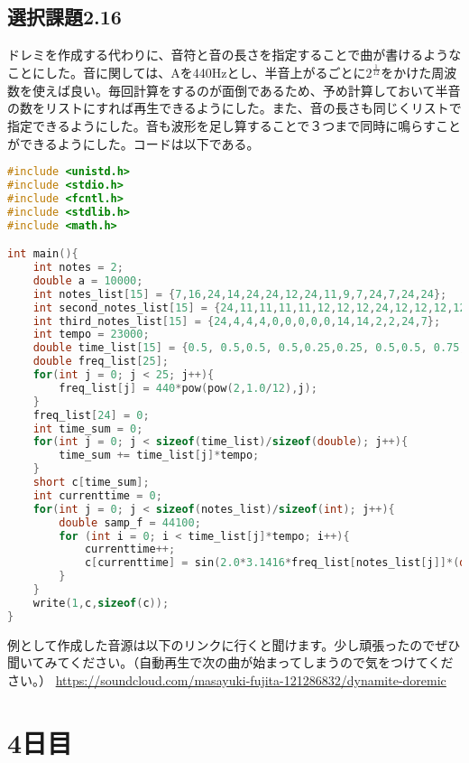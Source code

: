 \documentclass{ltjsarticle}
\begin{document}
\subsection{選択課題2.16}
ドレミを作成する代わりに、音符と音の長さを指定することで曲が書けるようなことにした。音に関しては、Aを440Hzとし、半音上がるごとに$2^\frac{1}{12}$をかけた周波数を使えば良い。毎回計算をするのが面倒であるため、予め計算しておいて半音の数をリストにすれば再生できるようにした。また、音の長さも同じくリストで指定できるようにした。音も波形を足し算することで３つまで同時に鳴らすことができるようにした。コードは以下である。
\begin{lstlisting}[caption=doremi.c,language=C]
#include <unistd.h>
#include <stdio.h>
#include <fcntl.h>
#include <stdlib.h>
#include <math.h>

int main(){
    int notes = 2;
    double a = 10000;
    int notes_list[15] = {7,16,24,14,24,24,12,24,11,9,7,24,7,24,24};
    int second_notes_list[15] = {24,11,11,11,11,12,12,12,24,12,12,12,12,24,11};
    int third_notes_list[15] = {24,4,4,4,0,0,0,0,0,14,14,2,2,24,7};
    int tempo = 23000;
    double time_list[15] = {0.5, 0.5,0.5, 0.5,0.25,0.25, 0.5,0.5, 0.75,0.5,0.23,0.02,0.5,0.5,1};
    double freq_list[25];
    for(int j = 0; j < 25; j++){
        freq_list[j] = 440*pow(pow(2,1.0/12),j);
    }
    freq_list[24] = 0;
    int time_sum = 0;
    for(int j = 0; j < sizeof(time_list)/sizeof(double); j++){
        time_sum += time_list[j]*tempo;
    }
    short c[time_sum];
    int currenttime = 0;
    for(int j = 0; j < sizeof(notes_list)/sizeof(int); j++){
        double samp_f = 44100;
        for (int i = 0; i < time_list[j]*tempo; i++){
            currenttime++;
            c[currenttime] = sin(2.0*3.1416*freq_list[notes_list[j]]*(double)i/samp_f) * a +  sin(2.0*3.1416*freq_list[second_notes_list[j]]*(double)i/2/samp_f) * a/1.8 +  sin(2.0*3.1416*freq_list[third_notes_list[j]]*(double)i/4/samp_f) * a;
        }
    }
    write(1,c,sizeof(c));
}
\end{lstlisting}
例として作成した音源は以下のリンクに行くと聞けます。少し頑張ったのでぜひ聞いてみてください。（自動再生で次の曲が始まってしまうので気をつけてください。）
\url{https://soundcloud.com/masayuki-fujita-121286832/dynamite-doremic}

\section{4日目}
\end{document}
